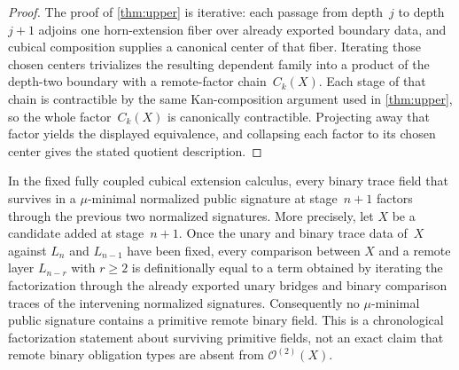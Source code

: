 \documentclass{lmcs}
\newcommand{\Ocal}{\mathcal{O}}
\begin{document}
\begin{proof}
The proof of \autoref{thm:upper} is iterative: each passage from depth~$j$ to depth~$j+1$ adjoins one horn-extension fiber over already exported boundary data, and cubical composition supplies a canonical center of that fiber. Iterating those chosen centers trivializes the resulting dependent family into a product of the depth-two boundary with a remote-factor chain~$C_k(X)$. Each stage of that chain is contractible by the same Kan-composition argument used in \autoref{thm:upper}, so the whole factor~$C_k(X)$ is canonically contractible. Projecting away that factor yields the displayed equivalence, and collapsing each factor to its chosen center gives the stated quotient description.
\end{proof}

\begin{thm}
\label{lem:telescopic}
In the fixed fully coupled cubical extension calculus, every binary trace field that survives in a $\mu$-minimal normalized public signature at stage~$n+1$ factors through the previous two normalized signatures. More precisely, let $X$ be a candidate added at stage~$n+1$. Once the unary and binary trace data of~$X$ against $L_n$ and $L_{n-1}$ have been fixed, every comparison between $X$ and a remote layer $L_{n-r}$ with $r \geq 2$ is definitionally equal to a term obtained by iterating the factorization through the already exported unary bridges and binary comparison traces of the intervening normalized signatures. Consequently no $\mu$-minimal public signature contains a primitive remote binary field.
This is a chronological factorization statement about surviving primitive fields, not an exact claim that remote binary obligation types are absent from $\Ocal^{(2)}(X)$.
\end{thm}
\end{document}
